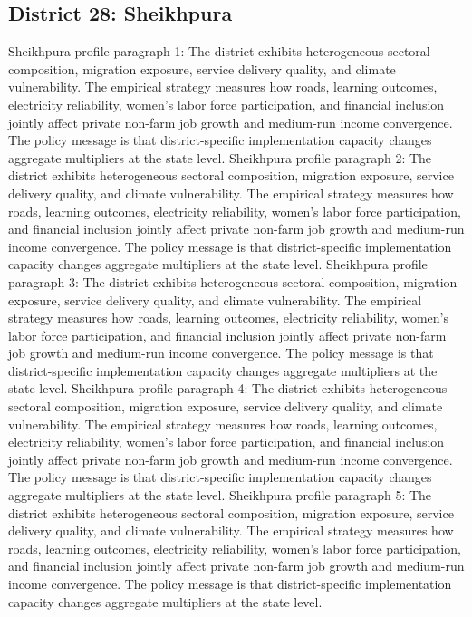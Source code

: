 \documentclass[preprint,12pt]{elsarticle}
\begin{document}
\subsection{District 28: Sheikhpura}
Sheikhpura profile paragraph 1: The district exhibits heterogeneous sectoral composition, migration exposure, service delivery quality, and climate vulnerability. The empirical strategy measures how roads, learning outcomes, electricity reliability, women's labor force participation, and financial inclusion jointly affect private non-farm job growth and medium-run income convergence. The policy message is that district-specific implementation capacity changes aggregate multipliers at the state level.
Sheikhpura profile paragraph 2: The district exhibits heterogeneous sectoral composition, migration exposure, service delivery quality, and climate vulnerability. The empirical strategy measures how roads, learning outcomes, electricity reliability, women's labor force participation, and financial inclusion jointly affect private non-farm job growth and medium-run income convergence. The policy message is that district-specific implementation capacity changes aggregate multipliers at the state level.
Sheikhpura profile paragraph 3: The district exhibits heterogeneous sectoral composition, migration exposure, service delivery quality, and climate vulnerability. The empirical strategy measures how roads, learning outcomes, electricity reliability, women's labor force participation, and financial inclusion jointly affect private non-farm job growth and medium-run income convergence. The policy message is that district-specific implementation capacity changes aggregate multipliers at the state level.
Sheikhpura profile paragraph 4: The district exhibits heterogeneous sectoral composition, migration exposure, service delivery quality, and climate vulnerability. The empirical strategy measures how roads, learning outcomes, electricity reliability, women's labor force participation, and financial inclusion jointly affect private non-farm job growth and medium-run income convergence. The policy message is that district-specific implementation capacity changes aggregate multipliers at the state level.
Sheikhpura profile paragraph 5: The district exhibits heterogeneous sectoral composition, migration exposure, service delivery quality, and climate vulnerability. The empirical strategy measures how roads, learning outcomes, electricity reliability, women's labor force participation, and financial inclusion jointly affect private non-farm job growth and medium-run income convergence. The policy message is that district-specific implementation capacity changes aggregate multipliers at the state level.
\end{document}
